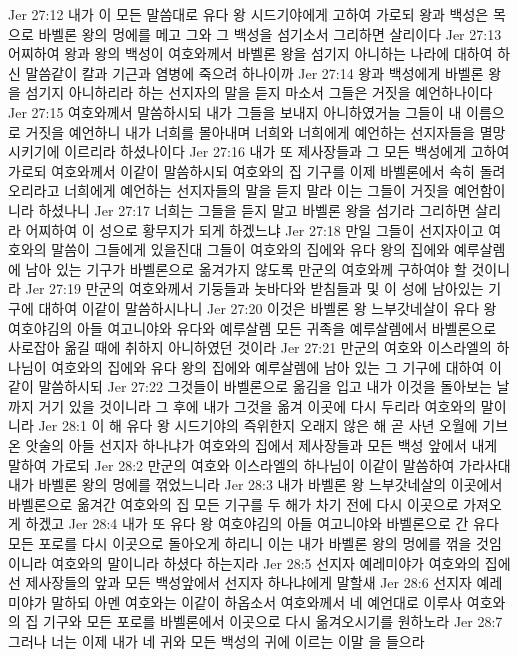 Jer 27:12  내가 이 모든 말씀대로 유다 왕 시드기야에게 고하여 가로되 왕과 백성은 목으로 바벨론 왕의 멍에를 메고 그와 그 백성을 섬기소서 그리하면 살리이다
Jer 27:13  어찌하여 왕과 왕의 백성이 여호와께서 바벨론 왕을 섬기지 아니하는 나라에 대하여 하신 말씀같이 칼과 기근과 염병에 죽으려 하나이까
Jer 27:14  왕과 백성에게 바벨론 왕을 섬기지 아니하리라 하는 선지자의 말을 듣지 마소서 그들은 거짓을 예언하나이다
Jer 27:15  여호와께서 말씀하시되 내가 그들을 보내지 아니하였거늘 그들이 내 이름으로 거짓을 예언하니 내가 너희를 몰아내며 너희와 너희에게 예언하는 선지자들을 멸망시키기에 이르리라 하셨나이다
Jer 27:16  내가 또 제사장들과 그 모든 백성에게 고하여 가로되 여호와께서 이같이 말씀하시되 여호와의 집 기구를 이제 바벨론에서 속히 돌려오리라고 너희에게 예언하는 선지자들의 말을 듣지 말라 이는 그들이 거짓을 예언함이니라 하셨나니
Jer 27:17  너희는 그들을 듣지 말고 바벨론 왕을 섬기라 그리하면 살리라 어찌하여 이 성으로 황무지가 되게 하겠느냐
Jer 27:18  만일 그들이 선지자이고 여호와의 말씀이 그들에게 있을진대 그들이 여호와의 집에와 유다 왕의 집에와 예루살렘에 남아 있는 기구가 바벨론으로 옮겨가지 않도록 만군의 여호와께 구하여야 할 것이니라
Jer 27:19  만군의 여호와께서 기둥들과 놋바다와 받침들과 및 이 성에 남아있는 기구에 대하여 이같이 말씀하시나니
Jer 27:20  이것은 바벨론 왕 느부갓네살이 유다 왕 여호야김의 아들 여고니야와 유다와 예루살렘 모든 귀족을 예루살렘에서 바벨론으로 사로잡아 옮길 때에 취하지 아니하였던 것이라
Jer 27:21  만군의 여호와 이스라엘의 하나님이 여호와의 집에와 유다 왕의 집에와 예루살렘에 남아 있는 그 기구에 대하여 이같이 말씀하시되
Jer 27:22  그것들이 바벨론으로 옮김을 입고 내가 이것을 돌아보는 날까지 거기 있을 것이니라 그 후에 내가 그것을 옮겨 이곳에 다시 두리라 여호와의 말이니라
Jer 28:1  이 해 유다 왕 시드기야의 즉위한지 오래지 않은 해 곧 사년 오월에 기브온 앗술의 아들 선지자 하나냐가 여호와의 집에서 제사장들과 모든 백성 앞에서 내게 말하여 가로되
Jer 28:2  만군의 여호와 이스라엘의 하나님이 이같이 말씀하여 가라사대 내가 바벨론 왕의 멍에를 꺾었느니라
Jer 28:3  내가 바벨론 왕 느부갓네살의 이곳에서 바벨론으로 옮겨간 여호와의 집 모든 기구를 두 해가 차기 전에 다시 이곳으로 가져오게 하겠고
Jer 28:4  내가 또 유다 왕 여호야김의 아들 여고니야와 바벨론으로 간 유다 모든 포로를 다시 이곳으로 돌아오게 하리니 이는 내가 바벨론 왕의 멍에를 꺾을 것임이니라 여호와의 말이니라 하셨다 하는지라
Jer 28:5  선지자 예레미야가 여호와의 집에 선 제사장들의 앞과 모든 백성앞에서 선지자 하나냐에게 말할새
Jer 28:6  선지자 예레미야가 말하되 아멘 여호와는 이같이 하옵소서 여호와께서 네 예언대로 이루사 여호와의 집 기구와 모든 포로를 바벨론에서 이곳으로 다시 옮겨오시기를 원하노라
Jer 28:7  그러나 너는 이제 내가 네 귀와 모든 백성의 귀에 이르는 이말 을 들으라
